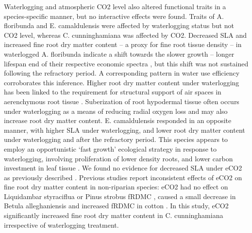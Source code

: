 \documentclass[12pt,a4paper]{memoir}
\begin{document}
Waterlogging and atmospheric CO2 level also altered functional traits in a species-specific manner, but no interactive effects were found. Traits of A. floribunda and E. camaldulensis were affected by waterlogging status but not CO2 level, whereas C. cunninghamiana was affected by CO2. Decreased SLA and increased fine root dry matter content – a proxy for fine root tissue density \cite{Birouste2013} – in waterlogged A. floribunda indicate a shift towards the slower growth – longer lifespan  end of their respective economic spectra \cite{Reich2014}, but this shift was not sustained following the refractory period. A corresponding pattern in water use efficiency corroborates this inference. Higher root dry matter content under waterlogging has been linked to the requirement for structural support of air spaces in aerenchymous root tissue \cite{Ryser2011}. Suberization of root hypodermal tissue often occurs under waterlogging as a means of reducing radial oxygen loss \cite{Visser2000, DeSimone2002} and may also increase root dry matter content. E. camaldulensis responded in an opposite manner, with higher SLA under waterlogging, and lower root dry matter content under waterlogging and after the refractory period. This species appears to employ an opportunistic ‘fast growth’ ecological strategy in response to waterlogging, involving proliferation of lower density roots, and lower carbon investment in leaf tissue \cite{Wright2004, Reich2014}. We found no evidence for decreased SLA under eCO2 as previously described \cite{Poorter2003a}. Previous studies report inconsistent effects of eCO2 on fine root dry matter content in non-riparian species: eCO2 had no effect on Liquidambar styraciflua or Pinus strobus fRDMC \cite{Bauer2001,Iversen2008}, caused a small decrease in Betula alleghaniensis \cite{Bauer2001} and increased fRDMC in cotton \cite{Prior1994}. In this study, eCO2 significantly increased fine root dry matter content in C. cunninghamiana irrespective of waterlogging treatment.
\end{document}

